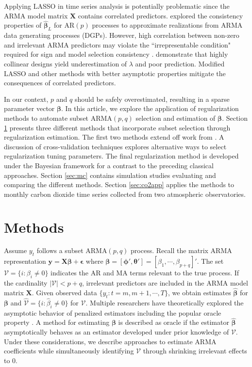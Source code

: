 Applying LASSO in time series analysis is potentially problematic since the ARMA model matrix $\bm{X}$ contains correlated predictors.  \cite{Nardi2011} explored the consistency properties of $\hat{\bm{\beta}}_{L}$ for AR$(p)$ processes to approximate realizations from ARMA data generating processes (DGPs). However, high correlation between non-zero and irrelevant ARMA predictors may violate the ``irrepresentable condition" required for sign and model selection consistency \citep{Zhao2006}. \cite{Hebiri2013} demonstrate that highly collinear designs yield underestimation of $\lambda$ and poor prediction. Modified LASSO and other methods with better asymptotic properties mitigate the consequences of correlated predictors.

In our context, $p$ and $q$ should be safely overestimated, resulting in a sparse parameter vector $\bm{\beta}$. In this article, we explore the application of regularization methods to automate subset ARMA$(p,q)$ selection and estimation of $\bm{\beta}$. Section \ref{sec:methods} presents three different methods that incorporate subset selection through regularization estimation. The first two methods extend off work from \cite{Chen2011}. A discussion of cross-validation techniques explores alternative ways to select regularization tuning parameters. The final regularization method is developed under the Bayesian framework for a contrast to the preceding classical approaches. Section \ref{sec:mc} contains simulation studies evaluating and comparing the different methods. Section \ref{sec:co2app} applies the methods to monthly carbon dioxide time series collected from two atmospheric observatories.










\section{Methods}
\label{sec:methods}

Assume $y_t$ follows a subset ARMA$(p,q)$ process. Recall the matrix ARMA representation $\bm{y}=\bm{X}\bm{\beta}+\bm{\epsilon}$ where $\bm{\beta}=[\bm{\phi}',\bm{\theta}']=[\beta_1,\cdots,\beta_{p+q}]'$. The set $\mathcal{V}=\{i:\beta_i\neq 0\}$ indicates the AR and MA terms relevant to the true process. If the cardinality $|\mathcal{V}|<p+q$, irrelevant predictors are included in the ARMA model matrix $\bm{X}$. Given observed data $\{y_t: t=m,m+1,\cdots,T\}$, we obtain estimates $\hat{\bm{\beta}}$ for $\bm{\beta}$ and $\hat{\mathcal{V}}=\{i:\hat{\beta}_i\neq 0\}$ for $\mathcal{V}$. Multiple researchers have theoretically explored the asymptotic behavior of penalized estimators including the popular oracle property \citep{Fan2001,Fan2004,Fan2011}. A method for estimating $\bm{\beta}$ is described as oracle if the estimator $\hat{\bm{\beta}}$ asymptotically behaves as an estimator developed under prior knowledge of $\mathcal{V}$. Under these considerations, we describe approaches to estimate ARMA coefficients while simultaneously identifying $\mathcal{V}$ through shrinking irrelevant effects to 0.

